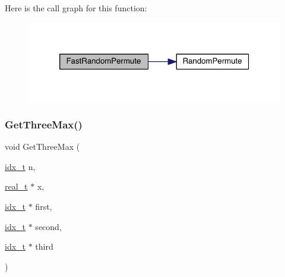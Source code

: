 Here is the call graph for this function\+:\nopagebreak
\begin{figure}[H]
\begin{center}
\leavevmode
\includegraphics[width=320pt]{a00873_aad45cf489b69af118f0277011c3deb71_cgraph}
\end{center}
\end{figure}
\mbox{\label{a00873_a893c1adfdd73d517232ee3260cb87940}} 
\subsubsection{\texorpdfstring{Get\+Three\+Max()}{GetThreeMax()}}
{\footnotesize\ttfamily void Get\+Three\+Max (\begin{DoxyParamCaption}\item[{\hyperlink{a00876_aaa5262be3e700770163401acb0150f52}{idx\+\_\+t}}]{n,  }\item[{\hyperlink{a00876_a1924a4f6907cc3833213aba1f07fcbe9}{real\+\_\+t} $\ast$}]{x,  }\item[{\hyperlink{a00876_aaa5262be3e700770163401acb0150f52}{idx\+\_\+t} $\ast$}]{first,  }\item[{\hyperlink{a00876_aaa5262be3e700770163401acb0150f52}{idx\+\_\+t} $\ast$}]{second,  }\item[{\hyperlink{a00876_aaa5262be3e700770163401acb0150f52}{idx\+\_\+t} $\ast$}]{third }\end{DoxyParamCaption})}

\mbox{\label{a00873_af575634c0140250791ab79b6de85b6e1}} 
